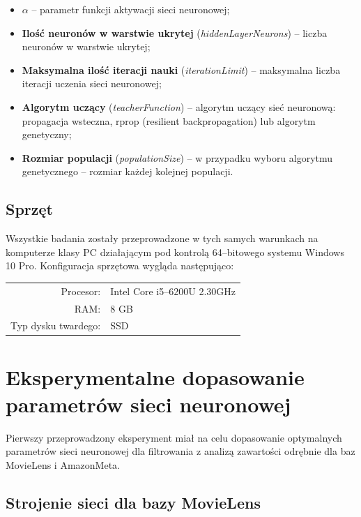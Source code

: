 \documentclass[twoside]{iisthesis}
\begin{document}
		 \begin{itemize}
		 	\item \textbf{$\alpha$} -- parametr funkcji aktywacji sieci neuronowej;
		 	\item \textbf{Ilość neuronów w warstwie ukrytej} (\textit{hiddenLayerNeurons}) -- liczba neuronów w warstwie ukrytej;
		 	\item \textbf{Maksymalna ilość iteracji nauki} (\textit{iterationLimit}) -- maksymalna liczba iteracji uczenia sieci neuronowej;
		 	\item \textbf{Algorytm uczący} (\textit{teacherFunction}) -- algorytm uczący sieć neuronową: propagacja wsteczna, rprop (resilient backpropagation) lub algorytm genetyczny;
		 	\item \textbf{Rozmiar populacji} (\textit{populationSize}) -- w przypadku wyboru algorytmu genetycznego -- rozmiar każdej kolejnej populacji.
		 	
		 \end{itemize}	 
		
		\subsection{Sprzęt}
		
		Wszystkie badania zostały przeprowadzone w tych samych warunkach na komputerze klasy PC działającym pod kontrolą 64--bitowego systemu Windows 10 Pro. Konfiguracja sprzętowa wygląda następująco:
		
		\begin{center}
			\begin{tabular}{ r  l  }
				Procesor: & Intel Core i5--6200U 2.30GHz \\ 
				RAM: & 8 GB \\  
				Typ dysku twardego: & SSD     
			\end{tabular}
		\end{center}
	
	\section{Eksperymentalne dopasowanie parametrów sieci neuronowej}
	
		Pierwszy przeprowadzony eksperyment miał na celu dopasowanie optymalnych parametrów sieci neuronowej dla filtrowania z analizą zawartości odrębnie dla baz MovieLens i AmazonMeta.
		
		\subsection{Strojenie sieci dla bazy MovieLens}
		\label{ss:strojeniemovielens}
\end{document}
